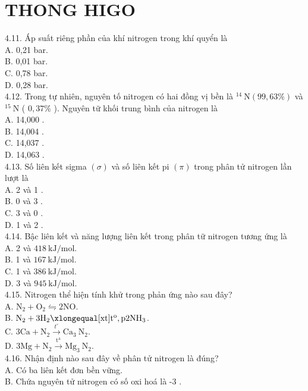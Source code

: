 \documentclass[10pt]{article}
\begin{document}
\section*{THONG HIGO}
4.11. Áp suất riêng phần của khí nitrogen trong khí quyển là\\
A. 0,21 bar.\\
B. 0,01 bar.\\
C. 0,78 bar.\\
D. 0,28 bar.\\
4.12. Trong tự nhiên, nguyên tố nitrogen có hai đồng vị bền là ${ }^{14} \mathrm{~N}(99,63 \%)$ và ${ }^{15} \mathrm{~N}$ ( $0,37 \%$ ). Nguyên tữ khối trung bình của nitrogen là\\
A. 14,000 .\\
B. 14,004 .\\
C. 14,037 .\\
D. 14,063 .\\
4.13. Số liên kết sigma $(\sigma)$ và số liên kết pi $(\pi)$ trong phân tử nitrogen lần lượt là\\
A. 2 và 1 .\\
B. 0 và 3 .\\
C. 3 và 0 .\\
D. 1 và 2 .\\
4.14. Bậc liên kết và năng lượng liên kết trong phân tữ nitrogen tương ứng là\\
A. 2 và $418 \mathrm{~kJ} / \mathrm{mol}$.\\
B. 1 và $167 \mathrm{~kJ} / \mathrm{mol}$.\\
C. 1 và $386 \mathrm{~kJ} / \mathrm{mol}$.\\
D. 3 và $945 \mathrm{~kJ} / \mathrm{mol}$.\\
4.15. Nitrogen thể hiện tính khử trong phản ứng nào sau đây?\\
A. $\mathrm{N}_{2}+\mathrm{O}_{2} \leftrightharpoons 2 \mathrm{NO}$.\\
B. $\mathrm{N}_{2}+3 \mathrm{H}_{2} \xlongequal[\mathrm{xt}]{\mathrm{t}^{\mathrm{o}}, \mathrm{p}} 2 \mathrm{NH}_{3}$.\\
C. $3 \mathrm{Ca}+\mathrm{N}_{2} \xrightarrow{t^{\circ}} \mathrm{Ca}_{3} \mathrm{~N}_{2}$.\\
D. $3 \mathrm{Mg}+\mathrm{N}_{2} \xrightarrow{\mathrm{t}^{\mathrm{a}}} \mathrm{Mg}_{3} \mathrm{~N}_{2}$.\\
4.16. Nhận định nào sau đây về phân tử nitrogen là đúng?\\
A. Có ba liên kết đơn bền vững.\\
B. Chứa nguyên tử nitrogen có số oxi hoá là -3 .\\
\end{document}
